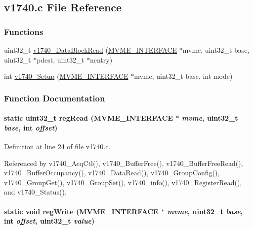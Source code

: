 \subsection{v1740.c File Reference}
\label{v1740_8c}
\subsubsection*{Functions}
\begin{DoxyCompactItemize}
\item 
uint32\_\-t \hyperlink{v1740_8c_a70d16d4fead8e9ea39dd9fcbddca7307}{v1740\_\-DataBlockRead} (\hyperlink{structMVME__INTERFACE}{MVME\_\-INTERFACE} $\ast$mvme, uint32\_\-t base, uint32\_\-t $\ast$pdest, uint32\_\-t $\ast$nentry)
\item 
int \hyperlink{v1740_8c_a3dac1849caf521655aa250acea6786ac}{v1740\_\-Setup} (\hyperlink{structMVME__INTERFACE}{MVME\_\-INTERFACE} $\ast$mvme, uint32\_\-t base, int mode)
\end{DoxyCompactItemize}


\subsubsection{Function Documentation}
\paragraph[{regRead}]{\setlength{\rightskip}{0pt plus 5cm}static uint32\_\-t regRead ({\bf MVME\_\-INTERFACE} $\ast$ {\em mvme}, \/  uint32\_\-t {\em base}, \/  int {\em offset})}\hfill\label{v1740_8c_a2296a7241a9fb55be401fb5c9845c7b7}


Definition at line 24 of file v1740.c.

Referenced by v1740\_\-AcqCtl(), v1740\_\-BufferFree(), v1740\_\-BufferFreeRead(), v1740\_\-BufferOccupancy(), v1740\_\-DataRead(), v1740\_\-GroupConfig(), v1740\_\-GroupGet(), v1740\_\-GroupSet(), v1740\_\-info(), v1740\_\-RegisterRead(), and v1740\_\-Status().
\paragraph[{regWrite}]{\setlength{\rightskip}{0pt plus 5cm}static void regWrite ({\bf MVME\_\-INTERFACE} $\ast$ {\em mvme}, \/  uint32\_\-t {\em base}, \/  int {\em offset}, \/  uint32\_\-t {\em value})}\hfill\label{v1740_8c_af268fb97f4bcf3a3c0d4e2839c5a2a93}


